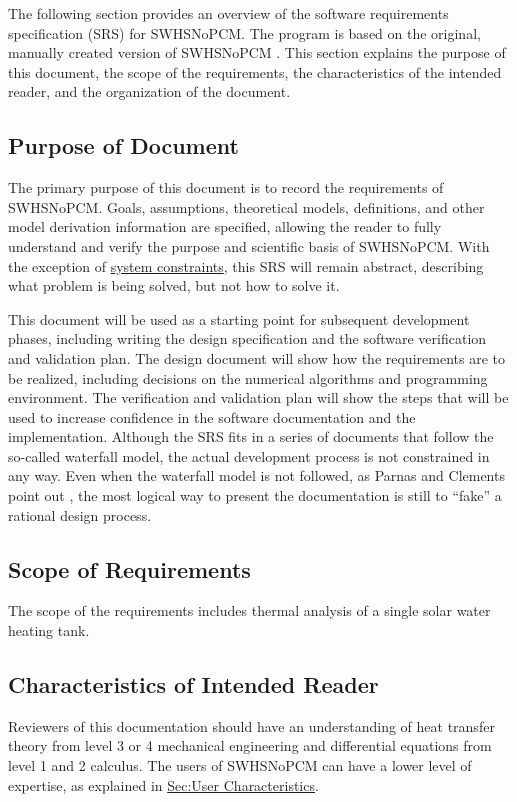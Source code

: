 \documentclass[12pt]{article}
\begin{document}
The following section provides an overview of the software requirements specification (SRS) for SWHSNoPCM. The program is based on the original, manually created version of SWHSNoPCM \cite{swhsNoPCMOriginal}. This section explains the purpose of this document, the scope of the requirements, the characteristics of the intended reader, and the organization of the document.

\subsection{Purpose of Document}
\label{Sec:DocPurpose}
The primary purpose of this document is to record the requirements of SWHSNoPCM. Goals, assumptions, theoretical models, definitions, and other model derivation information are specified, allowing the reader to fully understand and verify the purpose and scientific basis of SWHSNoPCM. With the exception of \hyperref[Sec:SysConstraints]{system constraints}, this SRS will remain abstract, describing what problem is being solved, but not how to solve it.

This document will be used as a starting point for subsequent development phases, including writing the design specification and the software verification and validation plan. The design document will show how the requirements are to be realized, including decisions on the numerical algorithms and programming environment. The verification and validation plan will show the steps that will be used to increase confidence in the software documentation and the implementation. Although the SRS fits in a series of documents that follow the so-called waterfall model, the actual development process is not constrained in any way. Even when the waterfall model is not followed, as Parnas and Clements point out \cite{parnasClements1986}, the most logical way to present the documentation is still to ``fake'' a rational design process.

\subsection{Scope of Requirements}
\label{Sec:ReqsScope}
The scope of the requirements includes thermal analysis of a single solar water heating tank.

\subsection{Characteristics of Intended Reader}
\label{Sec:ReaderChars}
Reviewers of this documentation should have an understanding of heat transfer theory from level 3 or 4 mechanical engineering and differential equations from level 1 and 2 calculus. The users of SWHSNoPCM can have a lower level of expertise, as explained in \hyperref[Sec:UserChars]{Sec:User Characteristics}.
\end{document}
